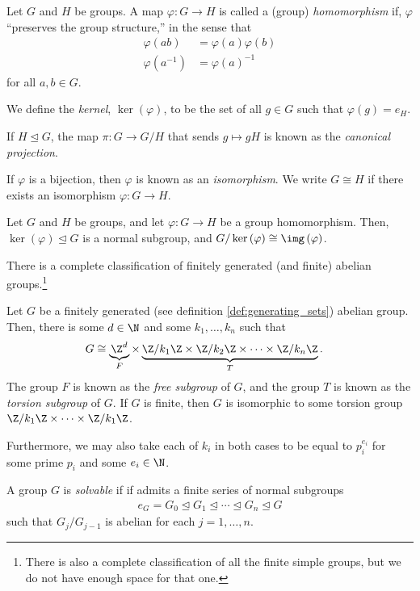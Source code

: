\begin{definition}
  Let $G$ and $H$ be groups. A map $\varphi\colon G\rightarrow H$ is called a (group) \textit{homomorphism} if, $\varphi$ ``preserves the group structure,'' in the sense that
  \begin{align*}
    \varphi\left(ab\right) &= \varphi(a)\varphi(b)\\
    \varphi\left(a^{-1}\right) &= \varphi(a)^{-1}
  \end{align*}
  for all $a,b\in G$.\newline

  We define the \textit{kernel}, $\ker\left(\varphi\right)$, to be the set of all $g\in G$ such that $\varphi\left(g\right) = e_H$.\newline

  If $H\trianglelefteq G$, the map $\pi\colon G\rightarrow G/H$ that sends $g\mapsto gH$ is known as the \textit{canonical projection}.\newline

  If $\varphi$ is a bijection, then $\varphi$ is known as an \textit{isomorphism}. We write $G\cong H$ if there exists an isomorphism $\varphi\colon G\rightarrow H$.
\end{definition}
\begin{theorem}
  Let $G$ and $H$ be groups, and let $\varphi\colon G\rightarrow H$ be a group homomorphism. Then, $\ker\left(\varphi\right)\trianglelefteq G$ is a normal subgroup, and $G/\ker\left(\varphi\right)\cong \img\left(\varphi\right)$.
\end{theorem}
There is a complete classification of finitely generated (and finite) abelian groups.\footnote{There is also a complete classification of all the finite simple groups, but we do not have enough space for that one.}
\begin{theorem}\label{thm:fundamental_thm_abelian_gps}
  Let $G$ be a finitely generated (see definition \ref{def:generating_sets}) abelian group. Then, there is some $d\in \N$ and some $k_1,\dots,k_n$ such that
  \begin{align*}
    G &\cong \underbrace{\Z^{d}}_{F}\times \underbrace{\Z/k_1\Z \times \Z/k_2\Z \times \cdots \times \Z/k_n\Z}_{T}. 
  \end{align*}
  The group $F$ is known as the \textit{free subgroup} of $G$, and the group $T$ is known as the \textit{torsion subgroup} of $G$. If $G$ is finite, then $G$ is isomorphic to some torsion group $\Z/k_1\Z\times \cdots \times \Z/k_1\Z$.\newline

  Furthermore, we may also take each of $k_i$ in both cases to be equal to $p_i^{e_i}$ for some prime $p_i$ and some $e_i\in \N$.
\end{theorem}
\begin{definition}
  A group $G$ is \textit{solvable} if if admits a finite series of normal subgroups
  \begin{align*}
    e_G = G_0\trianglelefteq G_1\trianglelefteq \cdots \trianglelefteq G_n \trianglelefteq G
  \end{align*}
  such that $G_{j}/G_{j-1}$ is abelian for each $j = 1,\dots,n$.
\end{definition}

